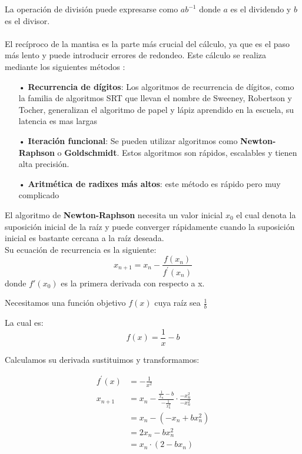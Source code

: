 \documentclass[a4paper,10pt,twocolumn]{article}
\begin{document}
\begin{itemize}
   
 La operación de división puede expresarse como $ab^{-1}$ donde $a$ es el dividendo y $b$ es el divisor. 
 \\\\
 El recíproco de la mantisa es la parte más crucial del cálculo, ya que es el paso más lento y puede introducir errores de redondeo. Este cálculo se realiza mediante los siguientes métodos \cite{Handbook} \cite{Divpaper}:
 \begin{itemize}
 \item[•] \textbf{Recurrencia de dígitos}: Los algoritmos de recurrencia de dígitos, como la familia de algoritmos SRT que llevan el nombre de Sweeney, Robertson y Tocher, generalizan el algoritmo de papel y lápiz aprendido en la escuela, su latencia es mas largas\\
 
 \item[•]  \textbf{Iteraci\'on funcional}: Se pueden utilizar algoritmos como \textbf{Newton-Raphson} o\textbf{ Goldschmidt}. Estos algoritmos son rápidos, escalables y tienen alta precisión.\\
  
  \item[•] \textbf{Aritm\'etica de radixes m\'as altos}:  este método es rápido pero muy complicado\\
 \end{itemize}
    
 El algoritmo de \textbf{Newton-Raphson} necesita un valor inicial $x_0$ el cual denota la suposici\'on inicial de la ra\'iz y puede converger r\'apidamente cuando la suposici\'on inicial es bastante cercana a la ra\'iz deseada.  \\

Su ecuaci\'on de recurrencia es la siguiente:
$$
x_{n+1}=x_{n}-\frac{f\left(x_{n}\right)}{f^{\prime}\left(x_{n}\right)}
$$
donde $f'(x_0)$ es la primera derivada con respecto a x.

Necesitamos una función objetivo $f(x)$ cuya raíz sea $\frac{1}{b}$

La cual es:
$$
f(x)=\frac{1}{x}-b
$$
	
Calculamos su derivada sustituimos y transformamos:

$$
\begin{aligned}
	f^{\prime}(x) &=-\frac{1}{x^{2}} \\
	x_{n+1} &=x_{n}-\frac{\frac{1}{x_{n}}-b}{-\frac{1}{x_{n}^{2}}} \cdot \frac{-x_{n}^{2}}{-x_{n}^{2}} \\
	&=x_{n}-\left(-x_{n}+b x_{n}^{2}\right) \\
	&=2 x_{n}-b x_{n}^{2} \\
	&=x_{n} \cdot\left(2-b x_{n}\right)
\end{aligned}
$$



\end{itemize}
\end{document}
